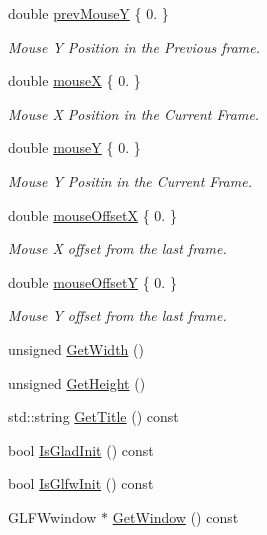 \begin{DoxyCompactItemize}
double \mbox{\hyperlink{class_window_af4a58a8da45b8aeeb36dbcae237bcef4}{prev\+MouseY}} \{ 0. \}
\begin{DoxyCompactList}\small\item\em Mouse Y Position in the Previous frame. \end{DoxyCompactList}\item 
double \mbox{\hyperlink{class_window_a68f752a9e5c04cf32a50b169df0de609}{mouseX}} \{ 0. \}
\begin{DoxyCompactList}\small\item\em Mouse X Position in the Current Frame. \end{DoxyCompactList}\item 
double \mbox{\hyperlink{class_window_a9f5f64a77451ba45212dab398f7b9dac}{mouseY}} \{ 0. \}
\begin{DoxyCompactList}\small\item\em Mouse Y Positin in the Current Frame. \end{DoxyCompactList}\item 
double \mbox{\hyperlink{class_window_a93b50aa557f493c5589af5dcc8f74c4a}{mouse\+OffsetX}} \{ 0. \}
\begin{DoxyCompactList}\small\item\em Mouse X offset from the last frame. \end{DoxyCompactList}\item 
double \mbox{\hyperlink{class_window_a22d84e6f9e9c7e283f303798b630c733}{mouse\+OffsetY}} \{ 0. \}
\begin{DoxyCompactList}\small\item\em Mouse Y offset from the last frame. \end{DoxyCompactList}\item 
unsigned \mbox{\hyperlink{class_window_a77d5347666653b9a20c389e0e412f700}{Get\+Width}} ()
\item 
unsigned \mbox{\hyperlink{class_window_a19c8d97415b163e5f641388f1d537085}{Get\+Height}} ()
\item 
std\+::string \mbox{\hyperlink{class_window_ae66865d49d16710c1cb11fd39ab7564f}{Get\+Title}} () const
\item 
bool \mbox{\hyperlink{class_window_acd18a545a32f73ae1dc0c1bd00573f20}{Is\+Glad\+Init}} () const
\item 
bool \mbox{\hyperlink{class_window_a84c80356e911db086098e29e8a870829}{Is\+Glfw\+Init}} () const
\item 
G\+L\+F\+Wwindow $\ast$ \mbox{\hyperlink{class_window_ad7e49197526473b23c01ecc9cd2292d2}{Get\+Window}} () const

\end{DoxyCompactItemize}

